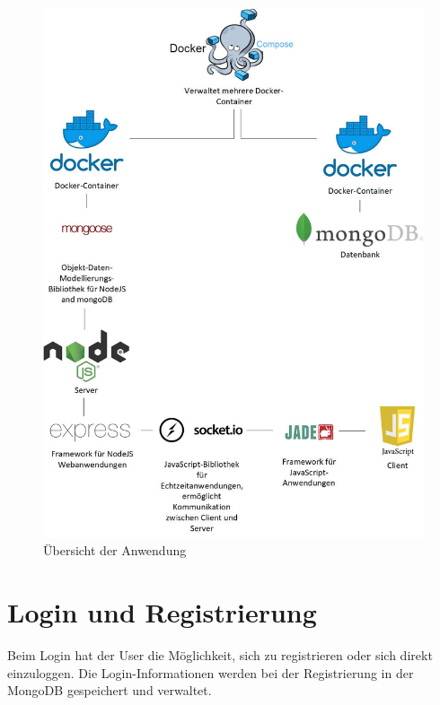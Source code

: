 \begin{figure}[H]
\centering
\includegraphics[width=1\textwidth]{images/uebersicht.jpg}
\caption{Übersicht der Anwendung}
\label{fig:koncept}
\end{figure}


\section{Login und Registrierung}\label{sec:Login}
Beim Login hat der User die Möglichkeit, sich zu registrieren oder sich direkt einzuloggen. Die Login-Informationen werden bei der Registrierung in der MongoDB gespeichert und verwaltet. 


